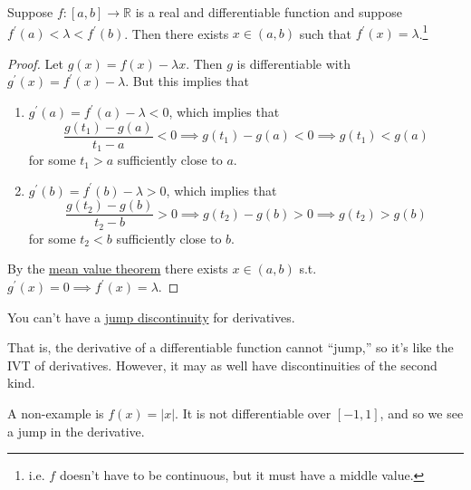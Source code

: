   \begin{theorem}
    \label{thm:ivt-der}
    Suppose $f: [a, b] \to \mathbb{R}$ is a real and differentiable function and suppose $f^\prime (a) < \lambda < f^\prime (b)$. Then there exists $x \in (a, b)$ such that $f^\prime (x) = \lambda$.\footnote{i.e. $f$ doesn't have to be continuous, but it must have a middle value.}
  \end{theorem}
  \begin{proof}
    Let $g(x) = f(x) - \lambda x$. Then $g$ is differentiable with $g^\prime (x) = f^\prime (x) - \lambda$. But this implies that
    \begin{enumerate}
      \item $g^\prime (a) = f^\prime (a) - \lambda < 0$, which implies that 
      \begin{equation}
        \frac{g(t_1) - g(a)}{t_1 - a} < 0 \implies g(t_1) - g(a) < 0 \implies g(t_1) < g(a)
      \end{equation}
      for some $t_1 > a$ sufficiently close to $a$. 

      \item $g^\prime (b) = f^\prime (b) - \lambda > 0$, which implies that 
      \begin{equation}
        \frac{g(t_2) - g(b)}{t_2 - b} > 0 \implies g(t_2) - g(b) > 0 \implies g(t_2) > g(b)
      \end{equation}
      for some $t_2 < b$ sufficiently close to $b$. 
    \end{enumerate}
    By the \hyperref[thm:mvt]{mean value theorem} there exists $x \in (a, b)$ s.t. $g^\prime (x) = 0 \implies f^\prime (x) = \lambda$. 
  \end{proof}

  \begin{corollary}
    \label{thm:derivatives-cannot-have-jump-discontinuities}
    You can't have a \hyperref[def:jump-discontinuity]{jump discontinuity} for derivatives. 
  \end{corollary}

  That is, the derivative of a differentiable function cannot ``jump,'' so it's like the IVT of derivatives. However, it may as well have discontinuities of the second kind. 

  \begin{example}
    \label{ex:derivative-might-jump-if-not-differentiable}
    A non-example is $f(x) = |x|$. It is not differentiable over $[-1, 1]$, and so we see a jump in the derivative. 
  \end{example}

